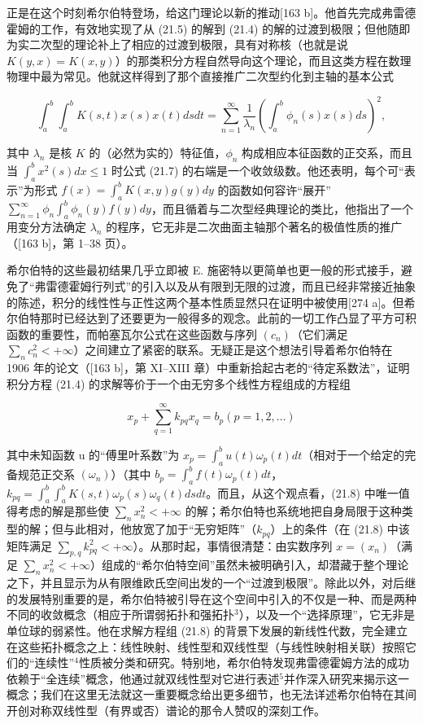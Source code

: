 正是在这个时刻希尔伯特登场，给这门理论以新的推动{[}163 b{]}。他首先完成弗雷德霍姆的工作，有效地实现了从 (21.5) 的解到 (21.4) 的解的过渡到极限；但他随即为实二次型的理论补上了相应的过渡到极限，具有对称核（也就是说 \(K(y, x) = K(x, y)\)）的那类积分方程自然导向这个理论，而且这类方程在数理物理中最为常见。他就这样得到了那个直接推广二次型约化到主轴的基本公式

\[
\int_ {a} ^ {b} \int_ {a} ^ {b} K (s, t) x (s) x (t) d s d t = \sum_ {n = 1} ^ {\infty} \frac {1}{\lambda_ {n}} \left(\int_ {a} ^ {b} \phi_ {n} (s) x (s) d s\right) ^ {2},\tag{21.7}
\]

其中 \(\lambda_{n}\) 是核 \(K\) 的（必然为实的）特征值，\(\phi_{n}\) 构成相应本征函数的正交系，而且当 \(\int_{a}^{b} x^{2}(s) dx \leq 1\) 时公式 (21.7) 的右端是一个收敛级数。他还表明，每个可“表示”为形式 \(f(x) = \int_{a}^{b} K(x, y) g(y) dy\) 的函数如何容许“展开” \(\sum_{n=1}^{\infty} \phi_{n} \int_{a}^{b} \phi_{n}(y) f(y) dy\)，而且循着与二次型经典理论的类比，他指出了一个用变分方法确定 \(\lambda_{n}\) 的程序，它无非是二次曲面主轴那个著名的极值性质的推广（{[}163 b{]}，第 1–38 页）。

希尔伯特的这些最初结果几乎立即被 E. 施密特以更简单也更一般的形式接手，避免了“弗雷德霍姆行列式”的引入以及从有限到无限的过渡，而且已经非常接近抽象的陈述，积分的线性性与正性这两个基本性质显然只在证明中被使用{[}274 a{]}。但希尔伯特那时已经达到了还要更为一般得多的观念。此前的一切工作凸显了平方可积函数的重要性，而帕塞瓦尔公式在这些函数与序列 \((c_{n})\)（它们满足 \(\sum_{n} c_{n}^{2} < +\infty\)）之间建立了紧密的联系。无疑正是这个想法引导着希尔伯特在 1906 年的论文（{[}163 b{]}，第 XI–XIII 章）中重新拾起古老的“待定系数法”，证明积分方程 (21.4) 的求解等价于一个由无穷多个线性方程组成的方程组

\[
x _ {p} + \sum_ {q = 1} ^ {\infty} k _ {p q} x _ {q} = b _ {p} (p = 1, 2, \dots)\tag{21.8}
\]

其中未知函数 u 的“傅里叶系数”为 \(x_{p} = \int_{a}^{b} u(t) \omega_{p}(t) dt\)（相对于一个给定的完备规范正交系 \((\omega_{n})\)）（其中 \(b_{p} = \int_{a}^{b} f(t) \omega_{p}(t) dt\)，\(k_{pq} = \int_{a}^{b} \int_{a}^{b} K(s, t) \omega_{p}(s) \omega_{q}(t) ds dt\)。而且，从这个观点看，(21.8) 中唯一值得考虑的解是那些使 \(\sum_{n} x_{n}^{2} < +\infty\) 的解；希尔伯特也系统地把自身局限于这种类型的解；但与此相对，他放宽了加于“无穷矩阵”（\(k_{pq}\)）上的条件（在 (21.8) 中该矩阵满足 \(\sum_{p,q} k_{pq}^{2} < +\infty\)）。从那时起，事情很清楚：由实数序列 \(x = (x_{n})\)（满足 \(\sum_{n} x_{n}^{2} < +\infty\)）组成的“希尔伯特空间”虽然未被明确引入，却潜藏于整个理论之下，并且显示为从有限维欧氏空间出发的一个“过渡到极限”。除此以外，对后继的发展特别重要的是，希尔伯特被引导在这个空间中引入的不仅是一种、而是两种不同的收敛概念（相应于所谓弱拓扑和强拓扑\(^{3}\)），以及一个“选择原理”，它无非是单位球的弱紧性。他在求解方程组 (21.8) 的背景下发展的新线性代数，完全建立在这些拓扑概念之上：线性映射、线性型和双线性型（与线性映射相关联）按照它们的“连续性”\(^{4}\)性质被分类和研究。特别地，希尔伯特发现弗雷德霍姆方法的成功依赖于“全连续”概念，他通过就双线性型对它进行表述\(^{5}\)并作深入研究来揭示这一概念；我们在这里无法就这一重要概念给出更多细节，也无法详述希尔伯特在其间开创对称双线性型（有界或否）谱论的那令人赞叹的深刻工作。

